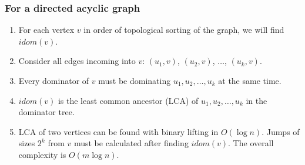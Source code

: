 \subsubsection*{For a directed acyclic graph}
\begin{enumerate}
\item For each vertex $v$ in order of topological sorting of the graph, we will find $idom(v)$.
\item Consider all edges incoming into $v$: $(u_1, v)$, $(u_2, v)$, $\ldots$, $(u_k, v)$.
\item Every dominator of $v$ must be dominating $u_1, u_2, \ldots, u_k$ at the same time.
\item $idom(v)$ is the least common ancestor (LCA) of $u_1, u_2, \ldots, u_k$ in the dominator tree.
\item LCA of two vertices can be found with binary lifting in $O(\log n)$. Jumps of sizes $2^k$ from $v$ must be calculated after finding $idom(v)$. The overall complexity is $O(m \log n)$.
\end{enumerate}

